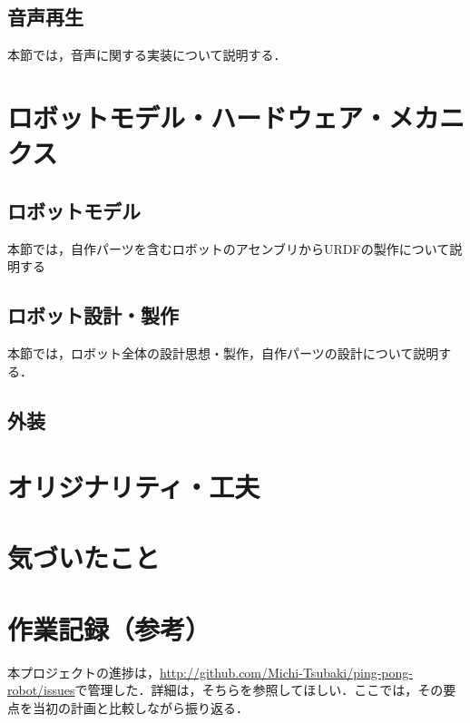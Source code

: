 \documentclass[10pt, oneside, titlepage]{ltjsarticle}  %
\begin{document}
\subsection{音声再生}
本節では，音声に関する実装について説明する．\cite{sound}
\section{ロボットモデル・ハードウェア・メカニクス}
\subsection{ロボットモデル}
本節では，自作パーツを含むロボットのアセンブリからURDFの製作について説明する
\subsection{ロボット設計・製作}
本節では，ロボット全体の設計思想・製作，自作パーツの設計について説明する．

\subsection{外装}

\section{オリジナリティ・工夫}

\section{気づいたこと}




\section{作業記録（参考）}
本プロジェクトの進捗は，\url{http://github.com/Michi-Tsubaki/ping-pong-robot/issues}で管理した．詳細は，そちらを参照してほしい．ここでは，その要点を当初の計画と比較しながら振り返る．
\end{document}
